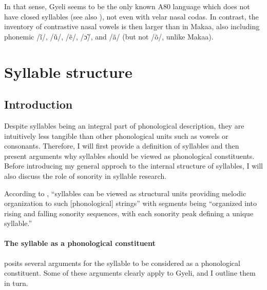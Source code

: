 In that sense, Gyeli seems to be the only known A80 language which does not have closed syllables (see also ), not even with velar nasal codas. In contrast, the inventory of contrastive nasal vowels is then larger than in Makaa, also including phonemic /ĩ/, /ũ/, /ẽ/, /ɔ̃/, and /ã/ (but not /õ/, unlike Makaa).







\section{Syllable structure}
\label{sec:Syllable}

\subsection{Introduction}
\label{sec:IntroSyll}

Despite syllables being an integral part of phonological description, they are intuitively less tangible than other phonological units such as vowels or consonants. Therefore, I will first provide a definition of syllables and then present arguments why syllables should be viewed as phonological constituents. Before introducing my general approch to the internal structure of syllables, I will also discuss the role of sonority in syllable research.

According to \citet[207]{blevins95}, ``syllables can be viewed as structural units providing melodic organization to such [phonological] strings''  with segments being ``organized into rising and falling sonority sequences, with each sonority peak defining a unique syllable.''

\paragraph{The syllable as a phonological constituent} \citet[207-10]{blevins95} posits several arguments for the syllable to be considered as a phonological constituent. Some of these arguments clearly apply to Gyeli, and I outline them in turn. 

